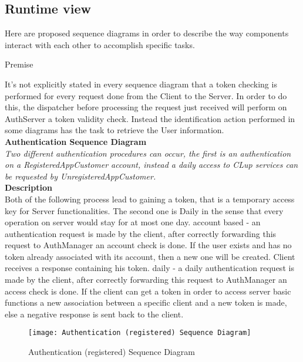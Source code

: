 \subsection{Runtime view}
Here are proposed sequence diagrams in order to describe the way components interact with each other to accomplish specific tasks.\\

\begin{center} 
Premise\\
\end{center}
It’s not explicitly stated in every sequence diagram that a token checking is performed for every request done from the Client to the Server. In order to do this, the dispatcher before processing the request just received will perform on AuthServer a token validity check. Instead the identification action performed in some diagrams has the task to retrieve the User information.\\

\newpage
\textbf{Authentication Sequence Diagram\\}
\textit{Two different authentication procedures can occur, the first is an authentication on a RegisteredAppCustomer account, instead a daily access to CLup services can be requested by UnregisteredAppCustomer.\\}
\textbf{Description\\}
Both of the following process lead to gaining a token, that is a temporary access key for Server functionalities. The second one is Daily in the sense that every operation on server would stay for at most one day.
account based - an authentication request is made by the client, after correctly forwarding this request to AuthManager an account check is done. If the user exists and has no token already associated with its account, then a new one will be created. Client receives a response containing his token. 
daily - a daily authentication request is made by the client, after correctly forwarding this request to AuthManager an access check is done. If the client can get a token in order to access server basic functions a new association between a specific client and a new token is made, else a negative response is sent back to the client. \\

\begin{figure}[H]
 \centering
 \texttt{[image: Authentication (registered) Sequence Diagram]}
 \caption{ Authentication (registered) Sequence Diagram}
 \end{figure}

